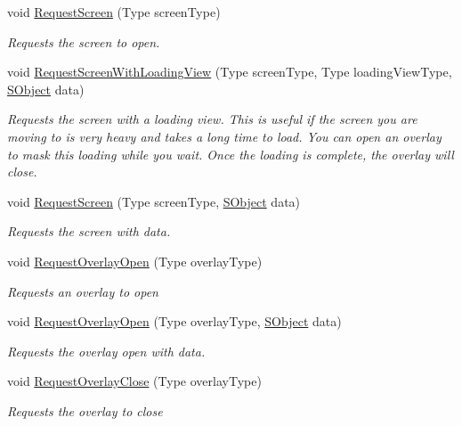 \begin{DoxyCompactItemize}
\item 
void \hyperlink{class_scaffolding_1_1_view_manager_a1153349d20cce467198780b7473ca20d}{Request\-Screen} (Type screen\-Type)
\begin{DoxyCompactList}\small\item\em Requests the screen to open. \end{DoxyCompactList}\item 
void \hyperlink{class_scaffolding_1_1_view_manager_ac8277accf4c311d3e00f6381d3c1c858}{Request\-Screen\-With\-Loading\-View} (Type screen\-Type, Type loading\-View\-Type, \hyperlink{class_scaffolding_1_1_s_object}{S\-Object} data)
\begin{DoxyCompactList}\small\item\em Requests the screen with a loading view. This is useful if the screen you are moving to is very heavy and takes a long time to load. You can open an overlay to mask this loading while you wait. Once the loading is complete, the overlay will close. \end{DoxyCompactList}\item 
void \hyperlink{class_scaffolding_1_1_view_manager_a3810a74e555482c79b4264bf19a65523}{Request\-Screen} (Type screen\-Type, \hyperlink{class_scaffolding_1_1_s_object}{S\-Object} data)
\begin{DoxyCompactList}\small\item\em Requests the screen with data. \end{DoxyCompactList}\item 
void \hyperlink{class_scaffolding_1_1_view_manager_a3228151a1d53fe86f49be2a35ec498f1}{Request\-Overlay\-Open} (Type overlay\-Type)
\begin{DoxyCompactList}\small\item\em Requests an overlay to open \end{DoxyCompactList}\item 
void \hyperlink{class_scaffolding_1_1_view_manager_afa5b87d7f4c473eab77d2e2747384a40}{Request\-Overlay\-Open} (Type overlay\-Type, \hyperlink{class_scaffolding_1_1_s_object}{S\-Object} data)
\begin{DoxyCompactList}\small\item\em Requests the overlay open with data. \end{DoxyCompactList}\item 
void \hyperlink{class_scaffolding_1_1_view_manager_a53ac113d01c1f5213787c1ef4724616c}{Request\-Overlay\-Close} (Type overlay\-Type)
\begin{DoxyCompactList}\small\item\em Requests the overlay to close \end{DoxyCompactList}\item 

\end{DoxyCompactItemize}
